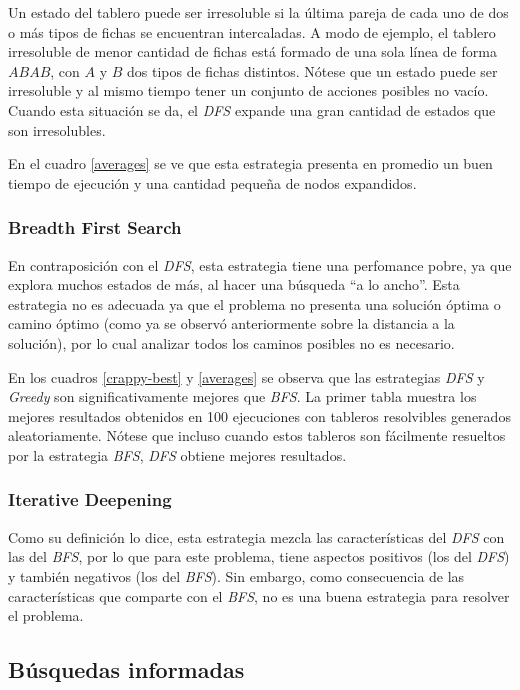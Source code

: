 \documentclass[a4paper,10pt]{article}
\begin{document}
    Un estado del tablero puede ser irresoluble si la última pareja de cada uno de dos o más tipos de fichas se encuentran intercaladas. A modo de ejemplo, el tablero irresoluble de menor cantidad de fichas está formado de una sola línea de forma $ABAB$, con $A$ y $B$ dos tipos de fichas distintos. Nótese que un estado puede ser irresoluble y al mismo tiempo tener un conjunto de acciones posibles no vacío. Cuando esta situación se da, el \textit{DFS} expande una gran cantidad de estados que son irresolubles.

    En el cuadro \ref{averages} se ve que esta estrategia presenta en promedio un buen tiempo de ejecución y una cantidad pequeña de nodos expandidos.
    
    \subsubsection{Breadth First Search}
    En contraposición con el \textit{DFS}, esta estrategia tiene una perfomance pobre, ya que explora muchos estados de más, al hacer una búsqueda ``a lo ancho''. Esta estrategia no es adecuada ya que el problema no presenta una solución óptima o camino óptimo (como ya se observó anteriormente sobre la distancia a la solución), por lo cual analizar todos los caminos posibles no es necesario.

    En los cuadros \ref{crappy-best} y \ref{averages} se observa que las estrategias \textit{DFS} y \textit{Greedy} son significativamente mejores que \textit{BFS}. La primer tabla muestra los mejores resultados obtenidos en 100 ejecuciones con tableros resolvibles generados aleatoriamente. Nótese que incluso cuando estos tableros son fácilmente resueltos por la estrategia \textit{BFS}, \textit{DFS} obtiene mejores resultados.

    \subsubsection{Iterative Deepening}

    Como su definición lo dice, esta estrategia mezcla las características del \textit{DFS} con las del \textit{BFS}, por lo que para este problema, tiene aspectos positivos (los del \textit{DFS}) y también negativos (los del \textit{BFS}). Sin embargo, como consecuencia de las características que comparte con el \textit{BFS}, no es una buena estrategia para resolver el problema.

\subsection{Búsquedas informadas}
    
\end{document}
